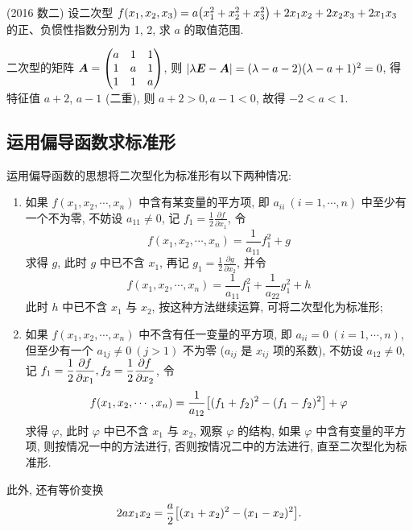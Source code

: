 \begin{example}
    (2016 数二) 设二次型 $f(x_1,x_2,x_3)=a\qty(x_1^2+x_2^2+x_3^2)+2x_1x_2+2x_2x_3+2x_1x_3$ 的正、负惯性指数分别为 1, 2, 求 $a$ 的取值范围.
\end{example}
\begin{solution}
    二次型的矩阵 $\vb*{A}=\mqty(a&1&1\\1&a&1\\1&1&a)$, 则 $|\lambda\vb*{E}-\vb*{A}|=(\lambda-a-2)(\lambda-a+1)^2=0$, 得特征值 $a+2$, $a-1$ (二重), 
    则 $a+2>0,a-1<0$, 故得 $-2<a<1.$
\end{solution}

\subsection{运用偏导函数求标准形}

运用偏导函数的思想将二次型化为标准形有以下两种情况:
\begin{enumerate}[label=(\arabic{*})]
    \item 如果 $ f(x_1,x_2,\cdots,x_n) $ 中含有某变量的平方项, 即 $ a_{i i}~ (i=1, \cdots, n) $ 中至少有一个不为零, 
          不妨设 $ a_{11} \neq 0 $, 记 $ \displaystyle f_{1}=\frac{1}{2} \frac{\partial f}{\partial x_{1}}$, 
          令 $$f(x_1,x_2,\cdots,x_n)=\frac{1}{a_{11}}f_1^2+g$$
          求得 $ g $, 此时 $ g $ 中已不含 $ x_{1}$, 再记 $ \displaystyle g_{1}=\frac{1}{2} \frac{\partial g}{\partial x_{2}} $, 并令
          $$f(x_1,x_2,\cdots,x_n)=\frac{1}{a_{11}}f_1^2+\frac{1}{a_{22}}g_1^2+h$$
          此时 $h$ 中已不含 $x_1$ 与 $x_2$, 按这种方法继续运算, 可将二次型化为标准形;
    \item 如果 $f(x_1,x_2,\cdots,x_n)$ 中不含有任一变量的平方项, 即 $a_{ii}=0~ (i=1,\cdots,n)$, 但至少有一个 $a_{1j}\neq 0~ (j>1)$ 不为零 ($a_{ij}$ 是 $x_{ij}$ 项的系数), 
          不妨设 $a_{12}\neq 0$, 记 $f_1=\dfrac{1}{2}\displaystyle\pdv{f}{x_1},f_2=\dfrac{1}{2}\displaystyle\pdv{f}{x_2}$, 令
          $$f(x_1,x_2,\cdots,x_n)=\dfrac{1}{a_{12}}\qty[(f_1+f_2)^2-(f_1-f_2)^2]+\varphi$$
          求得 $\varphi$, 此时 $\varphi$ 中已不含 $x_1$ 与 $x_2$, 观察 $\varphi$ 的结构, 如果 $\varphi$ 中含有变量的平方项, 则按情况一中的方法进行, 否则按情况二中的方法进行, 直至二次型化为标准形.
\end{enumerate}
此外, 还有等价变换 $$
2ax_1x_2=\dfrac{a}{2}\qty[(x_1+x_2)^2-(x_1-x_2)^2].
$$


